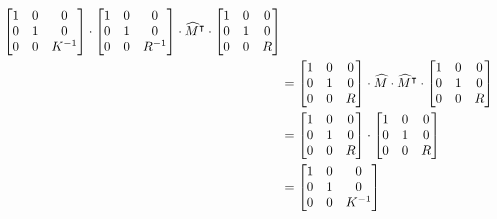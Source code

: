 \documentclass[newpage,hints,handout,noauthor,nooutcomes,12pt]{ximera}
\begin{document}
\begin{problem}
\begin{freeResponse}
\begin{align*}
\begin{bmatrix}
1 & 0 & 0\\
0 & 1 & 0\\
0 & 0 & K^{-1}
\end{bmatrix} \cdot
\begin{bmatrix}
1 & 0 & 0\\
0 & 1 & 0\\
0 & 0 & R^{-1}
\end{bmatrix} \cdot \widehat{M}^\intercal \cdot
\begin{bmatrix}
1 & 0 & 0\\
0 & 1 & 0\\
0 & 0 & R
\end{bmatrix}\\
&= \begin{bmatrix}
1 & 0 & 0\\
0 & 1 & 0\\
0 & 0 & R
\end{bmatrix} \cdot \widehat{M} \cdot \widehat{M}^\intercal \cdot
\begin{bmatrix}
1 & 0 & 0\\
0 & 1 & 0\\
0 & 0 & R
\end{bmatrix} \\
&= \begin{bmatrix}
1 & 0 & 0\\
0 & 1 & 0\\
0 & 0 & R
\end{bmatrix} \cdot
\begin{bmatrix}
1 & 0 & 0\\
0 & 1 & 0\\
0 & 0 & R
\end{bmatrix} \\
&= \begin{bmatrix}
1 & 0 & 0\\
0 & 1 & 0\\
0 & 0 & K^{-1}
\end{bmatrix}
\end{align*}


\end{freeResponse}
\end{problem}
\end{document}

